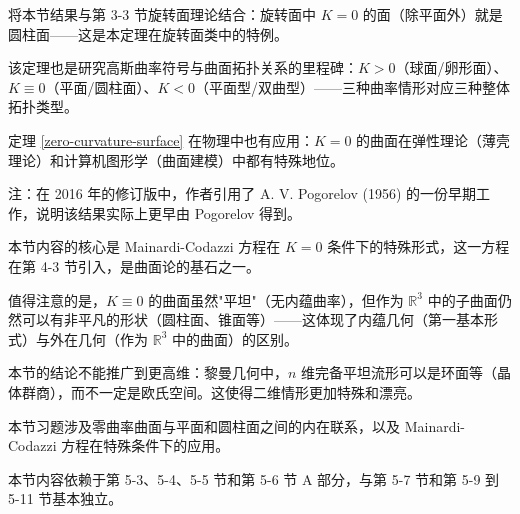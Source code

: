 \begin{Remark}

\begin{Remark}
将本节结果与第 3-3 节旋转面理论结合：旋转面中 $K=0$ 的面（除平面外）就是圆柱面——这是本定理在旋转面类中的特例。
\end{Remark}

\begin{Remark}
该定理也是研究高斯曲率符号与曲面拓扑关系的里程碑：$K>0$（球面/卵形面）、$K\equiv 0$（平面/圆柱面）、$K<0$（平面型/双曲型）——三种曲率情形对应三种整体拓扑类型。
\end{Remark}

\begin{Remark}
定理 \ref{zero-curvature-surface} 在物理中也有应用：$K=0$ 的曲面在弹性理论（薄壳理论）和计算机图形学（曲面建模）中都有特殊地位。
\end{Remark}

\begin{Remark}
注：在 2016 年的修订版中，作者引用了 A. V. Pogorelov (1956) 的一份早期工作，说明该结果实际上更早由 Pogorelov 得到。
\end{Remark}

\begin{Remark}
本节内容的核心是 Mainardi-Codazzi 方程在 $K=0$ 条件下的特殊形式，这一方程在第 4-3 节引入，是曲面论的基石之一。
\end{Remark}

\begin{Remark}
值得注意的是，$K \equiv 0$ 的曲面虽然"平坦"（无内蕴曲率），但作为 $\mathbb{R}^3$ 中的子曲面仍然可以有非平凡的形状（圆柱面、锥面等）——这体现了内蕴几何（第一基本形式）与外在几何（作为 $\mathbb{R}^3$ 中的曲面）的区别。
\end{Remark}

\begin{Remark}
本节的结论不能推广到更高维：黎曼几何中，$n$ 维完备平坦流形可以是环面等（晶体群商），而不一定是欧氏空间。这使得二维情形更加特殊和漂亮。
\end{Remark}

\begin{Remark}
本节习题涉及零曲率曲面与平面和圆柱面之间的内在联系，以及 Mainardi-Codazzi 方程在特殊条件下的应用。
\end{Remark}

\begin{Remark}
本节内容依赖于第 5-3、5-4、5-5 节和第 5-6 节 A 部分，与第 5-7 节和第 5-9 到 5-11 节基本独立。
\end{Remark}


\end{Remark}
